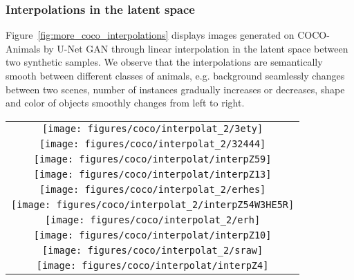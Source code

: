 \documentclass[10pt,twocolumn,letterpaper]{article}
\begin{document}
\subsubsection*{Interpolations in the latent space}

Figure~\ref{fig:more_coco_interpolations} displays images generated on COCO-Animals by U-Net GAN through linear interpolation in the latent space between two synthetic samples. 
We observe that the interpolations are semantically smooth between different classes of animals, e.g. background seamlessly changes between two scenes, number of instances gradually increases or decreases, shape and color of objects smoothly changes from left to right. 

\begin{figure*}
\begin{centering}
\setlength{\tabcolsep}{0.1em}
\renewcommand{\arraystretch}{1.0}
\par\end{centering}
\begin{centering}

\begin{tabular}{@{}c@{}}


\texttt{[image: figures/coco/interpolat\_2/3ety]}\tabularnewline



\texttt{[image: figures/coco/interpolat\_2/32444]}\tabularnewline


\texttt{[image: figures/coco/interpolat/interpZ59]}\tabularnewline

\texttt{[image: figures/coco/interpolat/interpZ13]}\tabularnewline



\texttt{[image: figures/coco/interpolat\_2/erhes]}\tabularnewline

\texttt{[image: figures/coco/interpolat\_2/interpZ54W3HE5R]}\tabularnewline


\texttt{[image: figures/coco/interpolat\_2/erh]}\tabularnewline


\texttt{[image: figures/coco/interpolat/interpZ10]}\tabularnewline

\texttt{[image: figures/coco/interpolat\_2/sraw]}\tabularnewline


\texttt{[image: figures/coco/interpolat/interpZ4]}\tabularnewline

\end{tabular}
\par\end{centering}
\caption{\label{fig:more_coco_interpolations} Images generated with U-Net GAN on COCO-Animals with resolution  when interpolating in the latent space between two synthetic samples (left to right).} 
\vspace{0em}
\end{figure*}
 
\end{document}
